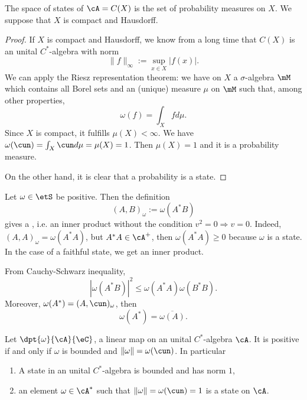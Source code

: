 
\begin{theorem}
The space of states of $\cA=C(X)$ is the set of probability measures on $X$. We suppose that $X$ is compact and Hausdorff.
\end{theorem}

\begin{proof}
If $X$ is compact and Hausdorff, we know from a long time that $C(X)$ is an unital $C^*$-algebra with norm
\[ 
  \| f \|_{\infty}:=\sup_{x\in X}| f(x) |.
\]
We can apply the Riesz representation theorem: we have on $X$ a $\sigma$-algebra $\mM$ which contains all Borel sets and an (unique) measure $\mu$ on $\mM$ such that, among other properties,
\begin{equation}
  \omega(f)=\int_Xfd\mu.
\end{equation}
Since $X$ is compact, it fulfills $\mu(X)<\infty$. We have $\omega(\cun)=\int_X\cun d\mu=\mu(X)=1$. Then $\mu(X)=1$ and it is a probability measure.

On the other hand, it is clear that a probability is a state.

\end{proof}

Let $\omega\in\etS$ be positive. Then the definition\label{PgStateInn}
\begin{equation} \label{eq:defprodetat}
(A,B)_{\omega}:=\omega(A^*B)
\end{equation}
gives a \label{pgdef_preinned}, i.e. an inner product without the condition $v^2=0\Rightarrow v=0$. Indeed, $(A,A)_{\omega}=\omega(A^*A)$, but $A^*A\in\cA^+$, then $\omega(A^*A)\geq 0$ because $\omega$ is a state. In the case of a faithful state, we get an inner product.

From Cauchy-Schwarz inequality,
\begin{equation} \label{eq:omABleq}
  | \omega(A^*B) |^2\leq \omega(A^*A)\omega(B^*B).
\end{equation}
Moreover, $\omega(A^*)=(A,\cun)_{\omega}$, then
\begin{equation} \label{eq:omABleqs}
  \omega(A^*)=\overline{\omega(A)}.
\end{equation}

\begin{proposition}
Let $\dpt{\omega}{\cA}{\eC}$, a linear map on an unital $C^*$-algebra $\cA$. It is positive if and only if $\omega$ is bounded and $\| \omega \|=\omega(\cun)$. In particular

\begin{enumerate}
\item A state in an unital $C^*$-algebra is bounded and has norm $1$, \label{71125ai}
\item an element $\omega\in\cA^*$ such that $\| \omega \|=\omega(\cun)=1$ is a state on $\cA$. \label{7125aii}
\end{enumerate}
\label{prop:linposboun}
\end{proposition}



